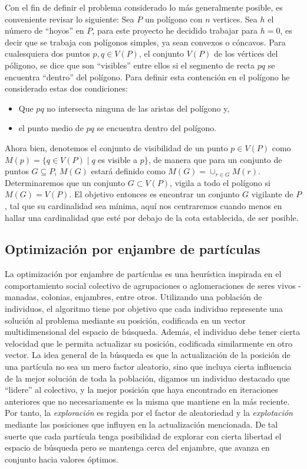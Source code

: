 \documentclass[12pt]{article}
\begin{document}
Con el fin de definir el problema considerado lo más generalmente posible, es conveniente revisar lo siguiente:
Sea $P$ un polígono con $n$ vertices. Sea $h$ el número de ``hoyos'' en $P$, para este proyecto he decidido trabajar para $h = 0$, es decir que se trabaja con polígonos simples, ya sean convexos o cóncavos.
Para cualesquiera dos puntos $p,q \in V(P)$, el conjunto $V(P)$ de los vértices del póligono, se dice que son ``visibles'' entre ellos si el segmento de recta $pq$ se encuentra ``dentro'' del polígono.
Para definir esta contención en el polígono he considerado estas dos condiciones:
\begin{itemize}
\item Que $pq$ no intersecta ninguna de las aristas del polígono y,
\item el punto medio de $pq$ se encuentra dentro del polígono.  
\end{itemize}
Ahora bien, denotemos el conjunto de visibilidad de un punto $p \in V(P)$ como $M(p) = \{q \in V(P)\;| \;q $ es visible a $p\}$, de manera que para un conjunto de puntos $G \subseteq P$, $M(G)$ estará definido como
$M(G) = \cup_{r \in G} M(r)$. Determinaremos que un conjunto $G \subset V(P)$, vigila a todo el polígono si $M(G) = V(P)$. El objetivo entonces es encontrar un conjunto $G$ vigilante de $P$, tal que su
cardinalidad sea mínima, aquí nos centraremos cuando menos en hallar una cardinalidad que esté por debajo de la cota establecida, de ser posible.





\subsection{Optimización por enjambre de partículas}
La optimización por enjambre de partículas es una heurística inspirada en el comportamiento social colectivo
de agrupaciones o aglomeraciones de seres vivos -manadas, colonias, enjambres, entre otros. Utilizando una población de individuos, el algoritmo tiene por objetivo que cada individuo represente una
solución al problema mediante su posición, codificada en un vector multidimensional del espacio de búsqueda. Además, el individuo debe tener cierta velocidad que le permita actualizar su posición, codificada similarmente en otro vector. La idea general de la búsqueda es que la actualización de la posición de una partícula no sea un mero factor aleatorio, sino que incluya cierta influencia de la mejor solución de toda la población, digamos un individuo destacado que ``lidere'' al colectivo, y la mejor posición que haya encontrado en iteraciones anteriores que no necesariamente es la misma que mantiene en la más reciente. Por tanto, la \textit{exploración} es regida por el factor de aleatoriedad y la \textit{explotación} mediante las posiciones que influyen en la actualización mencionada. De tal suerte que cada partícula tenga posibilidad de explorar con cierta libertad el espacio de búsqueda pero se mantenga cerca del enjambre, que avanza en conjunto hacia valores óptimos.
\end{document}

